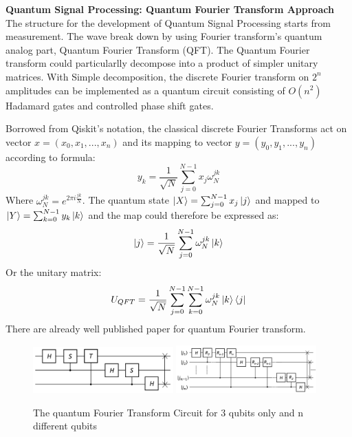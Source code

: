 \documentclass{article}
\begin{document}
\textbf{Quantum Signal Processing: Quantum Fourier Transform Approach}\newline
The structure for the development of Quantum Signal Processing starts from
measurement. The wave break down by using Fourier transform's quantum analog
part, Quantum Fourier Transform (QFT). The Quantum Fourier transform could
particularlly decompose into a product of simpler unitary matrices.
With Simple decomposition, the discrete Fourier transform on $2^n$ amplitudes
can be implemented as a quantum circuit consisting of $O(n^2)$ Hadamard
gates and controlled phase shift gates.

Borrowed from Qiskit's notation, the classical discrete Fourier Transforms
act on vector $x = (x_0, x_1,...,x_n)$ and its mapping to vector $y = (y_0, y_1,...,y_n)$
according to formula:
\begin{equation}
  y_k = \frac{1}{\sqrt{N}} \sum^{N-1}_{j=0} x_j \omega_N^{jk}
\end{equation}
Where $\omega_N^{jk} = e^{2\pi i \frac{jk}{N}}$. The quantum state
$ \ket{X} = \sum^{N-1}_{j=0} x_j \ket{j} $ and mapped to $ \ket{Y} = \sum^{N-1}_{k=0} y_k \ket{k} $
and the map could therefore be expressed as:
\begin{equation}
  \ket{j}  = \frac{1}{\sqrt{N}} \sum^{N-1}_{j=0} \omega_N^{jk} \ket{k}
\end{equation}
Or the unitary matrix:
\begin{equation}
  U_{QFT}= \frac{1}{\sqrt{N}} \sum^{N-1}_{j=0} \sum^{N-1}_{k=0}  \omega_N^{jk} \ket{k} \bra{j}
\end{equation}
There are already well published paper for quantum Fourier transform.

\begin{figure}[h]
  \includegraphics[width=0.48\textwidth]{qft2.png}
  \includegraphics[width=0.48\textwidth]{qft1.png}
  \caption{The quantum Fourier Transform Circuit for 3 qubits only and 
  n different qubits}
\end{figure}
\end{document}
